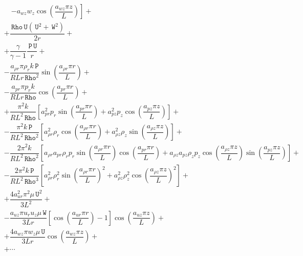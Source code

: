 \documentclass[10pt]{article}
\newcommand{\Rho}{\,\mathtt{Rho}}
\newcommand{\PP}{\,\mathtt{P}}
\newcommand{\U}{\,\mathtt{U}}
\newcommand{\W}{\,\mathtt{W}}
\begin{document}
\begin{equation*}
\begin{split}
  &\quad\left.-a_{wz} w_z \cos\left(\dfrac{a_{wz} \pi z}{L}\right)\right] +\\
&+ \dfrac{ \Rho \U(\U^2+\W^2)}{2r}+\\
&+\dfrac{\gamma}{\gamma-1} \dfrac{\PP \U }{r}+\\
& -\dfrac{a_{\rho r} \pi \rho_r k \PP }{R L r \Rho^2}\sin\left(\dfrac{a_{\rho r} \pi r}{L}\right) + \\
&-\dfrac{a_{pr} \pi p_r k }{R L r \Rho}\cos\left(\dfrac{a_{pr} \pi r}{L}\right) + \\
&+\dfrac{\pi^2 k}{R L^2 \Rho}\left[ a_{pr}^2 p_r\sin\left(\dfrac{a_{pr} \pi r}{L}\right)+ a_{pz}^2 p_z \cos\left(\dfrac{a_{pz} \pi z}{L}\right)\right] + \\
&-\dfrac{\pi^2 k \PP}{R L^2 \Rho^2}\left[ a_{\rho r}^2 \rho_r \cos\left(\dfrac{a_{\rho r} \pi r}{L}\right)+a_{\rho z}^2 \rho_z \sin\left(\dfrac{a_{\rho z} \pi z}{L}\right)\right]  + \\
&- \dfrac{2\pi^2 k}{R L^2 \Rho^2} \left[ a_{\rho r} a_{pr} \rho_r p_r \sin\left(\dfrac{a_{\rho r} \pi r}{L}\right) \cos\left(\dfrac{a_{pr} \pi r}{L}\right)+a_{\rho z} a_{pz} \rho_z p_z \cos\left(\dfrac{a_{\rho z} \pi z}{L}\right) \sin\left(\dfrac{a_{pz} \pi z}{L}\right)\right]  + \\
&- \dfrac{2 \pi^2 k \PP}{R L^2 \Rho^3}\left[ a_{\rho r}^2 \rho_r^2 \sin\left(\dfrac{a_{\rho r} \pi r}{L}\right)^2+a_{\rho z}^2 \rho_z^2 \cos\left(\dfrac{a_{\rho z} \pi z}{L}\right)^2\right]+\\
&+ \dfrac{4a_{ur}^2 \pi^2 \mu \U^2}{3L^2}+ \\
&-\dfrac{a_{uz} \pi u_r u_z \mu \W }{3Lr} \left[\cos\left(\dfrac{a_{ur} \pi r}{L}\right)-1\right] \cos\left(\dfrac{a_{uz} \pi z}{L}\right)+\\
&+\dfrac{4 a_{wz} \pi w_z \mu \U }{3Lr}\cos\left(\dfrac{a_{wz} \pi z}{L}\right)+\\
&+\cdots\\
\end{split}
\end{equation*}
\end{document}
